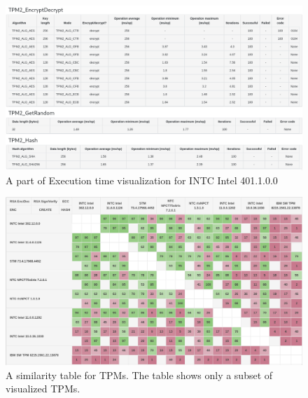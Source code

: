 \begin{landscape}
    \begin{figure}[!t]
        \includegraphics[width=\linewidth, height=\textwidth]{img/visualizations/tpm-execution-time.png}
        \caption{A part of Execution time visualization for INTC Intel 401.1.0.0}
    \end{figure}
\end{landscape}

\begin{landscape}
    \begin{figure}[!t]
        \includegraphics[width=\linewidth, height=\textwidth]{img/visualizations/tpm-similarity.png}
        \caption{A similarity table for TPMs. The table shows only a subset of visualized TPMs.}
    \end{figure}
\end{landscape}

